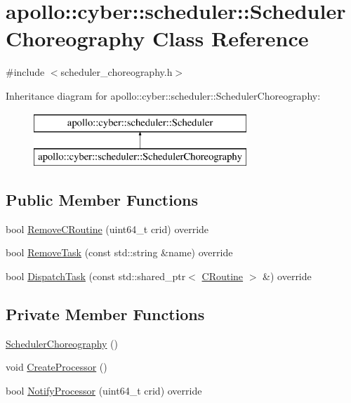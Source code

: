 \hypertarget{classapollo_1_1cyber_1_1scheduler_1_1SchedulerChoreography}{\section{apollo\-:\-:cyber\-:\-:scheduler\-:\-:Scheduler\-Choreography Class Reference}
\label{classapollo_1_1cyber_1_1scheduler_1_1SchedulerChoreography}
}


{\ttfamily \#include $<$scheduler\-\_\-choreography.\-h$>$}

Inheritance diagram for apollo\-:\-:cyber\-:\-:scheduler\-:\-:Scheduler\-Choreography\-:\begin{figure}[H]
\begin{center}
\leavevmode
\includegraphics[height=2.000000cm]{classapollo_1_1cyber_1_1scheduler_1_1SchedulerChoreography}
\end{center}
\end{figure}
\subsection*{Public Member Functions}
\begin{DoxyCompactItemize}
\item 
bool \hyperlink{classapollo_1_1cyber_1_1scheduler_1_1SchedulerChoreography_adeb5e2143b5437f3e86fb741b02a7736}{Remove\-C\-Routine} (uint64\-\_\-t crid) override
\item 
bool \hyperlink{classapollo_1_1cyber_1_1scheduler_1_1SchedulerChoreography_ad4d0fb12a12d3dfa7c3109a2762be1fc}{Remove\-Task} (const std\-::string \&name) override
\item 
bool \hyperlink{classapollo_1_1cyber_1_1scheduler_1_1SchedulerChoreography_af09ad84ea6f33c905ec2134c7a0b7c71}{Dispatch\-Task} (const std\-::shared\-\_\-ptr$<$ \hyperlink{classapollo_1_1cyber_1_1croutine_1_1CRoutine}{C\-Routine} $>$ \&) override
\end{DoxyCompactItemize}
\subsection*{Private Member Functions}
\begin{DoxyCompactItemize}
\item 
\hyperlink{classapollo_1_1cyber_1_1scheduler_1_1SchedulerChoreography_a522dc891affe735a0415af16c8929994}{Scheduler\-Choreography} ()
\item 
void \hyperlink{classapollo_1_1cyber_1_1scheduler_1_1SchedulerChoreography_a315e4898f5b03863713e5f6ade773593}{Create\-Processor} ()
\item 
bool \hyperlink{classapollo_1_1cyber_1_1scheduler_1_1SchedulerChoreography_a64e5f647a0c7a7adbee7d4daa12f7add}{Notify\-Processor} (uint64\-\_\-t crid) override
\end{DoxyCompactItemize}
